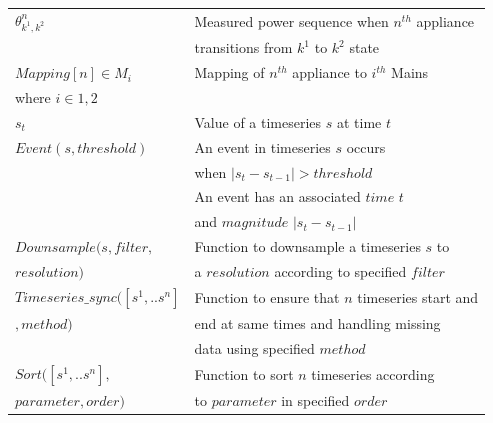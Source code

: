 \documentclass[conference]{IEEEtran}
\begin{document}
\begin{table}[ht!]
\begin{tabular}{|l|l|}
\hline
$\theta^n_{k^1,k^2}$& Measured power sequence when $n^{th}$ appliance \\[0.1cm]
& transitions from $k^1$ to $k^2$ state\\[0.1cm]
\hline
$Mapping[n] \in {M_i}$ & Mapping of $n^{th}$ appliance to $i^{th}$ Mains\\[0.1cm]
where $i \in {1,2}$ & \\
\hline 
$s_t$ & Value of a timeseries $s$ at time $t$ \\
\hline
$Event(s,threshold)$ & An event in timeseries $s$ occurs \\
&when $|s_t-s_{t-1}|>threshold$\\
& An event has an associated $time$ $t$\\
& and $magnitude$ $|s_t-s_{t-1}|$\\
\hline
\hline
$Downsample(s,filter,$ & Function to downsample a timeseries $s$ to\\[0.1cm]
$resolution)$                                        & a $resolution$ according to specified $filter$\\[0.1cm]
\hline
$Timeseries\_sync([s^1,..s^n]$ & Function to ensure that $n$ timeseries start and\\[0.1cm]
$,method)$                                        &end at same times and handling missing\\[0.1cm]
                                        & data using specified $method$\\[0.1cm]
\hline                                        
$Sort([s^1,..s^n],$ & Function to sort $n$ timeseries according\\[0.1cm]
$parameter,order)$  &to $parameter$ in specified $order$\\[0.1cm]

\end{tabular}
\end{table}
\end{document}
